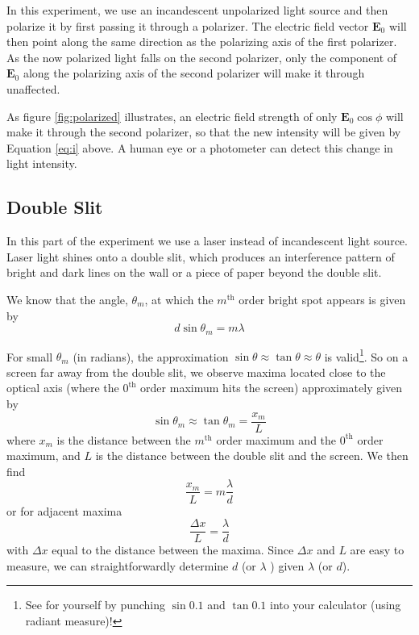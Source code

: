 In this experiment, we use an incandescent unpolarized light source and then polarize it by first passing it through a polarizer. The electric field vector $\mathbf{E}_{0}$ will then point along the same direction as the polarizing axis of the first polarizer. As the now polarized light falls on the second polarizer, only the component of $\mathbf{E}_{0}$ along the polarizing axis of the second polarizer will make it through unaffected. \myskip

As figure {\ref{fig:polarized}} illustrates, an electric field strength of only $\mathbf{E}_{0}\cos\phi$ will make it through the second polarizer, so that the new intensity will be given by Equation {\ref{eq:i}} above. A human eye or a photometer can detect this change in light intensity.

\subsection{Double Slit}
In this part of the experiment we use a laser instead of incandescent light source. Laser light shines onto a double slit, which produces an interference pattern of bright and dark lines on the wall or a piece of paper beyond the double slit. \myskip

We know that the angle, $\theta_{m}$, at which the $m^{\mathrm{th}}$ order bright spot appears is given by
\begin{equation}
  d\sin\theta_{m}=m\lambda
\end{equation}

For small $\theta_{m}$ (in radians), the approximation $\sin\theta \approx \tan\theta \approx \theta$ is valid\footnote{See for yourself by punching $\sin 0.1$ and $\tan 0.1$ into your calculator (using radiant measure)!}. So on a screen far away from the double slit, we observe maxima located close to the optical axis (where the $0^{\mathrm{th}}$ order maximum hits the screen) approximately given by
\begin{equation}
\sin\theta_{m}\approx\tan\theta_{m}=\frac{x_{m}}{L}
\end{equation}
where $x_m$ is the distance between the $m^{\mathrm{th}}$ order maximum and the $0^{\mathrm{th}}$ order maximum, and $L$ is the distance between the double slit and the screen. We then find
\begin{equation}
\frac{x_{m}}{L}=m\frac{\lambda}{d}
\end{equation}
or for adjacent maxima
\begin{equation}
  \frac{\Delta x}{L}=\frac{\lambda}{d}
\end{equation}
with $\Delta x$ equal to the distance between the maxima. Since $\Delta x$ and $L$ are easy to measure, we can straightforwardly determine $d$ (or $\lambda$ ) given $\lambda$ (or $d$).

